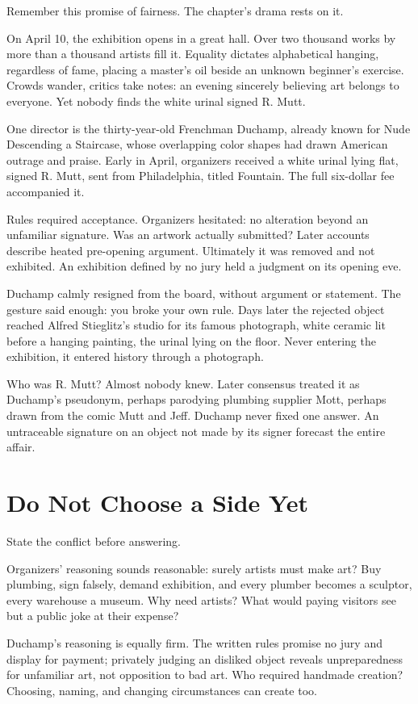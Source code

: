 Remember this promise of fairness. The chapter's drama rests on it.

On April 10, the exhibition opens in a great hall. Over two thousand works by more than a thousand artists fill it. Equality dictates alphabetical hanging, regardless of fame, placing a master's oil beside an unknown beginner's exercise. Crowds wander, critics take notes: an evening sincerely believing art belongs to everyone. Yet nobody finds the white urinal signed R. Mutt.

One director is the thirty-year-old Frenchman Duchamp, already known for Nude Descending a Staircase, whose overlapping color shapes had drawn American outrage and praise. Early in April, organizers received a white urinal lying flat, signed R. Mutt, sent from Philadelphia, titled Fountain. The full six-dollar fee accompanied it.

Rules required acceptance. Organizers hesitated: no alteration beyond an unfamiliar signature. Was an artwork actually submitted? Later accounts describe heated pre-opening argument. Ultimately it was removed and not exhibited. An exhibition defined by no jury held a judgment on its opening eve.

Duchamp calmly resigned from the board, without argument or statement. The gesture said enough: you broke your own rule. Days later the rejected object reached Alfred Stieglitz's studio for its famous photograph, white ceramic lit before a hanging painting, the urinal lying on the floor. Never entering the exhibition, it entered history through a photograph.

Who was R. Mutt? Almost nobody knew. Later consensus treated it as Duchamp's pseudonym, perhaps parodying plumbing supplier Mott, perhaps drawn from the comic Mutt and Jeff. Duchamp never fixed one answer. An untraceable signature on an object not made by its signer forecast the entire affair.

\section{Do Not Choose a Side Yet}
State the conflict before answering.

Organizers' reasoning sounds reasonable: surely artists must make art? Buy plumbing, sign falsely, demand exhibition, and every plumber becomes a sculptor, every warehouse a museum. Why need artists? What would paying visitors see but a public joke at their expense?

Duchamp's reasoning is equally firm. The written rules promise no jury and display for payment; privately judging an disliked object reveals unpreparedness for unfamiliar art, not opposition to bad art. Who required handmade creation? Choosing, naming, and changing circumstances can create too.

